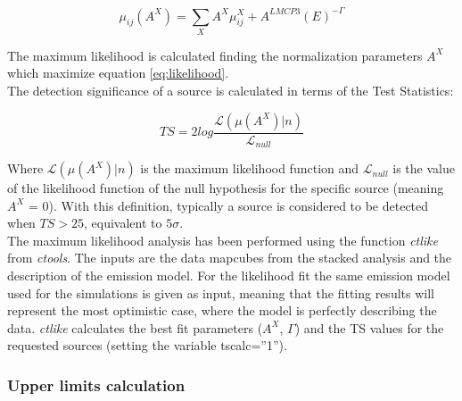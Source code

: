 \documentclass[main.tex]{subfiles}
\begin{document}
\begin{equation}
  \mu_{ij}(A^{X}) = \sum_{X} A^{X} \mu^{X}_{ij} + A^{LMC P3}(E)^{-\Gamma}
\end{equation}

The maximum likelihood is calculated finding the normalization parameters $A^{X}$ which maximize equation \ref{eq:likelihood}.\\
The detection significance of a source is calculated in terms of the Test Statistics:

\begin{equation}
  TS = 2log \frac{\mathcal{L}(\mu(A^{X})|n)}{\mathcal{L}_{null}}
  \label{eq:ts}
\end{equation}

Where $\mathcal{L}(\mu(A^{X})|n)$ is the maximum likelihood function and $\mathcal{L}_{null}$ is the value of the likelihood function of the null hypothesis for the specific source (meaning $A^X$ = 0). With this definition, typically a source is considered to be detected when $TS>25$, equivalent to $5\sigma$.\\
The maximum likelihood analysis has been performed using the function \textit{ctlike} from \textit{ctools}. The inputs are the data mapcubes from the stacked analysis and the description of the emission model. For the likelihood fit the same emission model used for the simulations is given as input, meaning that the fitting results will represent the most optimistic case, where the model is perfectly describing the data. \textit{ctlike} calculates the best fit parameters ($A^X$, $\Gamma$) and the TS values for the requested sources (setting the variable tscalc=''1'').

\subsubsection{Upper limits calculation} \label{sec:ulimits}
\end{document}
